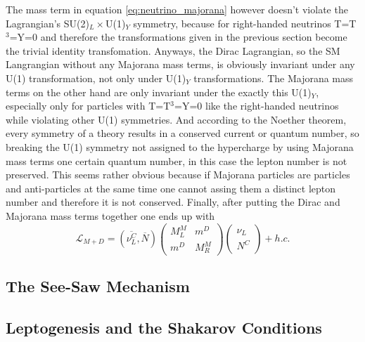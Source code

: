 The mass term in equation \ref{eq:neutrino_majorana} however doesn't violate the Lagrangian's SU(2)$_L\times$U(1)$_Y$ symmetry, because for right-handed neutrinos T=T$^3$=Y=0 and therefore the transformations given in the previous section become the trivial identity transfomation. Anyways, the Dirac Lagrangian, so the SM Langrangian without any Majorana mass terms, is obviously invariant under any U(1) transformation, not only under U(1)$_Y$ transformations. The Majorana mass terms on the other hand are only invariant under the exactly this U(1)$_Y$, especially only for particles with T=T$^3$=Y=0 like the right-handed neutrinos while violating other U(1) symmetries. And according to the Noether theorem, every symmetry of a theory results in a conserved current or quantum number, so breaking the U(1) symmetry not assigned to the hypercharge by using Majorana mass terms one certain quantum number, in this case the lepton number is not preserved. This seems rather obvious because if Majorana particles are particles and anti-particles at the same time one cannot assing them a distinct lepton number and therefore it is not conserved. \newline
Finally, after putting the Dirac and Majorana mass terms together one ends up with \cite[pp. 21]{Taanila:2008}
\begin{equation}
	\mathcal{L}_{M+D}=\left(\overline{\nu^C_L},\overline{N}\right)	\left(\begin{array}{cc}M^M_L&m^D\\m^D&M^M_R\end{array}\right)	\left(\begin{array}{c}\nu_L\\N^C\end{array}\right)+h.c.
\end{equation}
\subsection{The See-Saw Mechanism}
\subsection{Leptogenesis and the Shakarov Conditions}